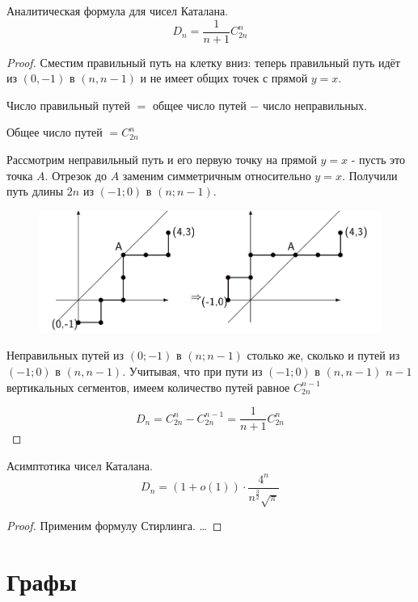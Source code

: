 \documentclass[a4paper, 14pt]{article}
\begin{document}
    \begin{theorem}
        Аналитическая формула для чисел Каталана.
        \[D_n = \dfrac{1}{n+1}C^n_{2n}\]
    \end{theorem}
    \begin{proof}
        Сместим правильный путь на клетку вниз: теперь правильный
        путь идёт из $(0, -1)$ в $(n, n-1)$ и не имеет общих точек
        с прямой $y=x$.

        Число правильный путей $=$ общее число путей $-$ число неправильных.

        Общее число путей $= C^n_{2n}$

        Рассмотрим неправильный путь и его первую точку на 
        прямой $y=x$ - пусть это точка $A$. Отрезок до $A$ заменим
        симметричным относительно $y=x$. Получили путь длины $2n$
        из $(-1; 0)$ в $(n; n-1)$.

        \begin{figure}[ht!]
            \centering
            \includegraphics[width=150mm]{Capture2.PNG}
        \end{figure}

        Неправильных путей из $(0; -1)$ в $(n;n-1)$ 
        столько же, сколько и путей из $(-1; 0)$ в $(n, n-1)$.
        Учитывая, что при пути из $(-1;0)$ в $(n, n-1)$ $n-1$ вертикальных сегментов, имеем
        количество путей равное $C_{2n}^{n-1}$ 

        \[D_n = C^n_{2n} - C^{n-1}_{2n} = \dfrac{1}{n+1}C_{2n}^n\]
    \end{proof}

    \begin{theorem}
        Асимптотика чисел Каталана.
        \[D_n = (1 + o(1)) \cdot \dfrac{4^n}{n^{\frac{3}{2}}\sqrt{\pi}}\]
    \end{theorem}
    \begin{proof}
        Применим формулу Стирлинга. \dots
    \end{proof}

    \section{Графы}
\end{document}
